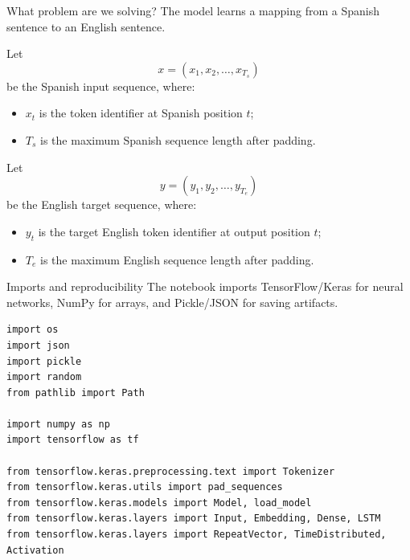 \documentclass[aspectratio=169]{beamer}
\begin{document}
%
%
\begin{frame}[fragile]{What problem are we solving?}
The model learns a mapping from a Spanish sentence to an English sentence.

\vspace{0.3cm}
Let
\[
    x = (x_1, x_2, \ldots, x_{T_s})
\]
be the Spanish input sequence, where:
\begin{itemize}
    \item $x_t$ is the token identifier at Spanish position $t$;
    \item $T_s$ is the maximum Spanish sequence length after padding.
\end{itemize}

Let
\[
    y = (y_1, y_2, \ldots, y_{T_e})
\]
be the English target sequence, where:
\begin{itemize}
    \item $y_t$ is the target English token identifier at output position $t$;
    \item $T_e$ is the maximum English sequence length after padding.
\end{itemize}
\end{frame}
%
%
\begin{frame}[fragile]{Imports and reproducibility}
The notebook imports TensorFlow/Keras for neural networks, NumPy for arrays, and Pickle/JSON for saving artifacts.

\begin{lstlisting}
import os
import json
import pickle
import random
from pathlib import Path

import numpy as np
import tensorflow as tf

from tensorflow.keras.preprocessing.text import Tokenizer
from tensorflow.keras.utils import pad_sequences
from tensorflow.keras.models import Model, load_model
from tensorflow.keras.layers import Input, Embedding, Dense, LSTM
from tensorflow.keras.layers import RepeatVector, TimeDistributed, Activation
\end{lstlisting}
\end{frame}
%
%
\end{document}
